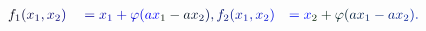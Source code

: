 \documentclass[12pt]{article}
\begin{document}
\makeatletter
\renewcommand*{\@textcolor}[3]{%
  \protect\leavevmode
  \begingroup
    \color#1{#2}#3%
  \endgroup
}
\makeatother
\begin{displaymath}
\begin{array} {rlr} \displaystyle { \mathcolor[RGB]{0,0,15}{f} _ { \mathcolor[RGB]{0,0,30}{1} } \mathcolor[RGB]{0,0,45}{(} \mathcolor[RGB]{0,0,60}{x} _ { \mathcolor[RGB]{0,0,75}{1} } \mathcolor[RGB]{0,0,90}{,} \mathcolor[RGB]{0,0,105}{x} _ { \mathcolor[RGB]{0,0,120}{2} } \mathcolor[RGB]{0,0,135}{)} } & \displaystyle { { } \mathcolor[RGB]{0,0,150}{=} \mathcolor[RGB]{0,0,165}{x} _ { \mathcolor[RGB]{0,0,180}{1} } \mathcolor[RGB]{0,0,195}{+} \mathcolor[RGB]{0,0,210}{\varphi} \mathcolor[RGB]{0,0,225}{(} \mathcolor[RGB]{0,0,240}{a} \mathcolor[RGB]{0,0,255}{x} _ { \mathcolor[RGB]{0,15,0}{1} } \mathcolor[RGB]{0,15,15}{-} \mathcolor[RGB]{0,15,30}{a} \mathcolor[RGB]{0,15,45}{x} _ { \mathcolor[RGB]{0,15,60}{2} } \mathcolor[RGB]{0,15,75}{)} \mathcolor[RGB]{0,15,90}{,} \mathcolor[RGB]{0,15,105}{f} _ { \mathcolor[RGB]{0,15,120}{2} } \mathcolor[RGB]{0,15,135}{(} \mathcolor[RGB]{0,15,150}{x} _ { \mathcolor[RGB]{0,15,165}{1} } \mathcolor[RGB]{0,15,180}{,} \mathcolor[RGB]{0,15,195}{x} _ { \mathcolor[RGB]{0,15,210}{2} } \mathcolor[RGB]{0,15,225}{)} } & \displaystyle { \mathcolor[RGB]{0,15,240}{=} \mathcolor[RGB]{0,15,255}{x} _ { \mathcolor[RGB]{0,30,0}{2} } \mathcolor[RGB]{0,30,15}{+} \mathcolor[RGB]{0,30,30}{\varphi} \mathcolor[RGB]{0,30,45}{(} \mathcolor[RGB]{0,30,60}{a} \mathcolor[RGB]{0,30,75}{x} _ { \mathcolor[RGB]{0,30,90}{1} } \mathcolor[RGB]{0,30,105}{-} \mathcolor[RGB]{0,30,120}{a} \mathcolor[RGB]{0,30,135}{x} _ { \mathcolor[RGB]{0,30,150}{2} } \mathcolor[RGB]{0,30,165}{)} \mathcolor[RGB]{0,30,180}{.} } \end{array}
\end{displaymath}
\end{document}
